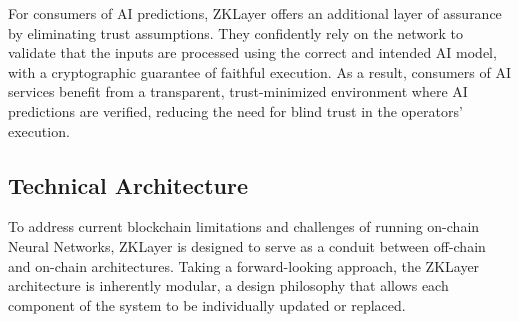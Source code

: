 \documentclass[conference]{IEEEtran}
\begin{document}
For consumers of AI predictions, ZKLayer offers an additional layer of assurance by eliminating trust assumptions. They confidently rely on the network to validate that the inputs are processed using the correct and intended AI model, with a cryptographic guarantee of faithful execution.  As a result, consumers of AI services benefit from a transparent, trust-minimized environment where AI predictions are verified, reducing the need for blind trust in the operators' execution.

\subsection{Technical Architecture}

To address current blockchain limitations and challenges of running on-chain Neural Networks, ZKLayer is designed to serve as a conduit between off-chain and on-chain architectures. Taking a forward-looking approach, the ZKLayer architecture is inherently modular, a design philosophy that allows each component of the system to be individually updated or replaced.
\end{document}
